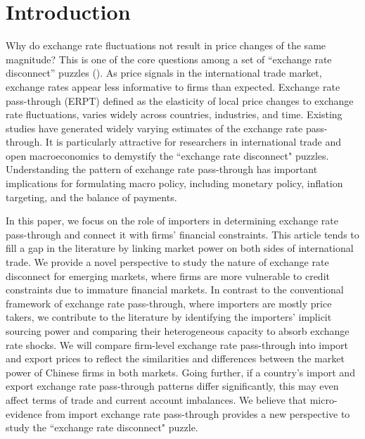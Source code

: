 \documentclass[12pt]{article}
\begin{document}
\section{Introduction} \label{Introduction}

Why do exchange rate fluctuations not result in price changes of the same magnitude? This is one of the core questions among a set of ``exchange rate disconnect'' puzzles (\cite{obstfeld2000}). As price signals in the international trade market, exchange rates appear less informative to firms than expected. Exchange rate pass-through (ERPT) defined as the elasticity of local price changes to exchange rate fluctuations, varies widely across countries, industries, and time. Existing studies have generated widely varying estimates of the exchange rate pass-through. It is particularly attractive for researchers in international trade and open macroeconomics to demystify the ``exchange rate disconnect" puzzles. Understanding the pattern of exchange rate pass-through has important implications for formulating macro policy, including monetary policy, inflation targeting, and the balance of payments.

In this paper, we focus on the role of importers in determining exchange rate pass-through and connect it with firms' financial constraints. This article tends to fill a gap in the literature by linking market power on both sides of international trade. We provide a novel perspective to study the nature of exchange rate disconnect for emerging markets, where firms are more vulnerable to credit constraints due to immature financial markets. In contrast to the conventional framework of exchange rate pass-through, where importers are mostly price takers, we contribute to the literature by identifying the importers' implicit sourcing power and comparing their heterogeneous capacity to absorb exchange rate shocks. We will compare firm-level exchange rate pass-through into import and export prices to reflect the similarities and differences between the market power of Chinese firms in both markets. Going further, if a country's import and export exchange rate pass-through patterns differ significantly, this may even affect terms of trade and current account imbalances. We believe that micro-evidence from import exchange rate pass-through provides a new perspective to study the ``exchange rate disconnect" puzzle.
\end{document}
